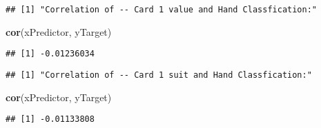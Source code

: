 \documentclass[]{article}
\newenvironment{Shaded}{\begin{snugshade}}{\end{snugshade}}
\newcommand{\KeywordTok}[1]{\textcolor[rgb]{0.13,0.29,0.53}{\textbf{#1}}}
\newcommand{\StringTok}[1]{\textcolor[rgb]{0.31,0.60,0.02}{#1}}
\newcommand{\CommentTok}[1]{\textcolor[rgb]{0.56,0.35,0.01}{\textit{#1}}}
\newcommand{\OperatorTok}[1]{\textcolor[rgb]{0.81,0.36,0.00}{\textbf{#1}}}
\newcommand{\NormalTok}[1]{#1}
\begin{document}
\begin{Shaded}
\end{Shaded}

\begin{verbatim}
## [1] "Correlation of -- Card 1 value and Hand Classfication:"
\end{verbatim}

\begin{Shaded}
\begin{Highlighting}[]
\KeywordTok{cor}\NormalTok{(xPredictor, yTarget)}
\end{Highlighting}
\end{Shaded}

\begin{verbatim}
## [1] -0.01236034
\end{verbatim}

\begin{Shaded}
\end{Shaded}

\begin{verbatim}
## [1] "Correlation of -- Card 1 suit and Hand Classfication:"
\end{verbatim}

\begin{Shaded}
\begin{Highlighting}[]
\KeywordTok{cor}\NormalTok{(xPredictor, yTarget)}
\end{Highlighting}
\end{Shaded}

\begin{verbatim}
## [1] -0.01133808
\end{verbatim}
\end{document}
